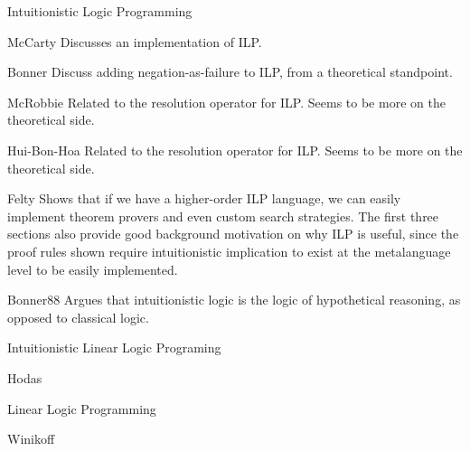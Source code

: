 \begin{pgroup}{Intuitionistic Logic Programming}
  \begin{paper}{McCarty}
    Discusses an implementation of ILP.
    \mustread
  \end{paper}

  \begin{paper}{Bonner}
    Discuss adding negation-as-failure to ILP, from a theoretical standpoint.
    \mustread
  \end{paper}

  \begin{paper}{McRobbie}
    Related to the resolution operator for ILP.
    Seems to be more on the theoretical side.
    \mustread
  \end{paper}

  \begin{paper}{Hui-Bon-Hoa}
    Related to the resolution operator for ILP.
    Seems to be more on the theoretical side.
    \mustread
  \end{paper}

  \begin{paper}{Felty}
    Shows that if we have a higher-order ILP language, we can easily implement theorem provers and even custom search strategies.
    The first three sections also provide good background motivation on why ILP is useful, since the proof rules shown require intuitionistic implication to exist at the metalanguage level to be easily implemented.
    \mustread
  \end{paper}

  \begin{paper}{Bonner88}
    Argues that intuitionistic logic is the logic of hypothetical reasoning, as opposed to classical logic.
    \mustread
  \end{paper}
\end{pgroup}

\begin{pgroup}{Intuitionistic Linear Logic Programing}
  \begin{paper}{Hodas}
    \mustread
  \end{paper}
\end{pgroup}

\begin{pgroup}{Linear Logic Programming}
  \begin{paper}{Winikoff}
    \mustread
  \end{paper}
\end{pgroup}

